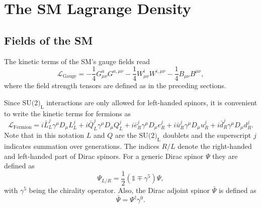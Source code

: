 \documentclass[a4paper,12pt]{book}
\begin{document}
\section{The SM Lagrange Density}
\subsection{Fields of the SM}
The kinetic terms of the SM's gauge fields read
\begin{equation}
\label{eq::Lgauge}
\mathcal{L}_{\text{Gauge}}=-\frac{1}{4}G_{\mu\nu}^a G^{a,\mu\nu} -\frac{1}{4}W_{\mu\nu}^i W^{i,\mu\nu} -\frac{1}{4}B_{\mu\nu} B^{\mu\nu},
\end{equation}
where the field strength tensors are defined as in the preceding sections.\par
Since $\text{SU(2)}_\text{L}$ interactions are only allowed for left-handed spinors, it is convenient to write the kinetic terms for fermions as
\begin{equation}
\label{eq::Lfermion}
\mathcal{L}_{\text{Fermion}} = i \bar{L}^j_L\gamma^\mu D_\mu L^j_L+i \bar{Q}^j_L\gamma^\mu D_\mu Q^j_L+i \bar{e}^j_R\gamma^\mu D_\mu e^j_R+i \bar{u}^j_R\gamma^\mu D_\mu u^j_R + i \bar{d}^j_R\gamma^\mu D_\mu d^j_R.
\end{equation}
Note that in this notation $L$ and $Q$ are the $\text{SU(2)}_\text{L}$ doublets and the superscript $j$ indicates summation over generations. The indices $R/L$ denote the right-handed and left-handed part of Dirac spinors. For a generic Dirac spinor $\Psi$ they are defined as
\begin{equation}
\Psi_{L/R} = \frac{1}{2}(\mathds{1}\mp \gamma^5)\Psi,
\end{equation}
with $\gamma^5$ being the chirality operator. Also, the Dirac adjoint spinor $\bar{\Psi}$ is defined as
\begin{equation}
\bar{\Psi} = \Psi^\dagger \gamma^0.
\end{equation}
\end{document}
